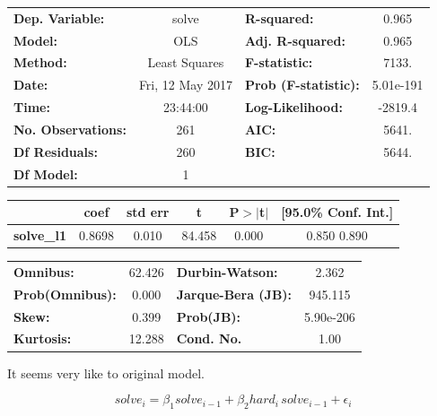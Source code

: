 \documentclass{article}
\begin{document}
\begin{center}
\begin{tabular}{lclc}
\toprule
\textbf{Dep. Variable:}    &      solve       & \textbf{  R-squared:         } &     0.965   \\
\textbf{Model:}            &       OLS        & \textbf{  Adj. R-squared:    } &     0.965   \\
\textbf{Method:}           &  Least Squares   & \textbf{  F-statistic:       } &     7133.   \\
\textbf{Date:}             & Fri, 12 May 2017 & \textbf{  Prob (F-statistic):} & 5.01e-191   \\
\textbf{Time:}             &     23:44:00     & \textbf{  Log-Likelihood:    } &   -2819.4   \\
\textbf{No. Observations:} &         261      & \textbf{  AIC:               } &     5641.   \\
\textbf{Df Residuals:}     &         260      & \textbf{  BIC:               } &     5644.   \\
\textbf{Df Model:}         &           1      & \textbf{                     } &             \\
\bottomrule
\end{tabular}
\begin{tabular}{lccccc}
                  & \textbf{coef} & \textbf{std err} & \textbf{t} & \textbf{P$>$$|$t$|$} & \textbf{[95.0\% Conf. Int.]}  \\
\midrule
\textbf{solve\_l1} &       0.8698  &        0.010     &    84.458  &         0.000        &         0.850     0.890       \\
\bottomrule
\end{tabular}
\begin{tabular}{lclc}
\textbf{Omnibus:}       & 62.426 & \textbf{  Durbin-Watson:     } &     2.362  \\
\textbf{Prob(Omnibus):} &  0.000 & \textbf{  Jarque-Bera (JB):  } &   945.115  \\
\textbf{Skew:}          &  0.399 & \textbf{  Prob(JB):          } & 5.90e-206  \\
\textbf{Kurtosis:}      & 12.288 & \textbf{  Cond. No.          } &      1.00  \\
\bottomrule
\end{tabular}
\end{center}


It seems very like to original model. 

\[
solve_i = \beta_1 solve_{i-1} + \beta_2 hard_i \, solve_{i-1} + \epsilon_i
\]
\end{document}
